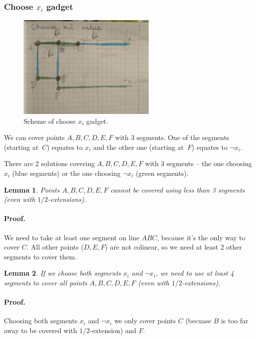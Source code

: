 \documentclass[en]{pracamgr}
\newtheorem{lemma}{Lemma}[section]
\begin{document}
\subsubsection{Choose $x_i$ gadget}
\begin{figure}[h]
\includegraphics[width=0.6\textwidth]{choose_x_gadget.jpg}
\caption{Scheme of choose $x_i$ gadget.}
\label{fig:choose_x_gadget}
\end{figure}

We can cover points $A, B, C, D, E, F$ with 3 segments.
One of the segments (starting at~$C$) equates to $x_i$
and the other one (starting at~$F$) equates to $\neg x_i$.

There are 2 solutions covering $A, B, C, D, E, F$
with 3 segments -- the one choosing $x_i$ (blue segments)
or the one choosing $\neg x_i$ (green segments).

\begin{lemma}
Points $A, B, C, D, E, F$ cannot be covered using less than
3 segments (even with $1/2$-extensions).
\end{lemma}
\paragraph{Proof.}
We need to take at least one segment on line $ABC$,
because it's the only way to cover $C$.
All other points ($D, E, F$) are not colinear,
so we need at least 2 other segments to cover them.

\begin{lemma}
If we choose both segments $x_i$ and $\neg x_i$, we need to use at
least 4 segments to cover all points $A, B, C, D, E, F$
(even with $1/2$-extensions).
\end{lemma}

\paragraph{Proof.}
Choosing both segments $x_i$ and $\neg x_i$
we only cover points $C$
(becuase $B$ is too far away to be covered with $1/2$-extension)
and $F$.
\end{document}
